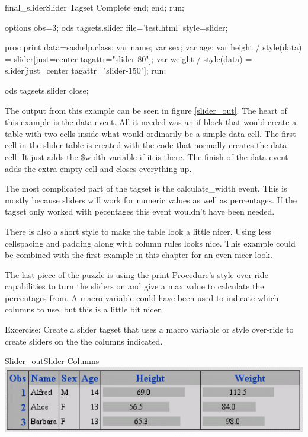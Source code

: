 \begin{fvcode}{final_slider}{Slider Tagset Complete}
        end;
    end;
run;

options obs=3;
ods tagsets.slider file='test.html' style=slider;

proc print data=sashelp.class;
    var name;
    var sex;
    var age;     
    var height / style(data) = slider[just=center tagattr="slider-80"];
    var weight / style(data) = slider[just=center tagattr="slider-150"];
run;

ods tagsets.slider close;
\end{fvcode}        

The output from this example can be seen in figure \vref{slider_out}.
The heart of this example is the data event.  
All it needed was an if block that would create a table with two
cells inside what would ordinarily be a simple data cell.  The first cell
in the slider table is created with the code that normally creates the data
cell.  It just adds the \$width variable if it is there.  The finish
of the data event adds the extra empty cell and closes everything up.

The most complicated part of the tagset is the calculate\_width event.
This is mostly because sliders will work for numeric values as well as
percentages.
If the tagset only worked with pecentages this event wouldn't have been needed.

There is also a short style to make the table look a little nicer.  
Using less cellspacing and padding along with column rules looks nice.  
This example could be combined with the first example in this chapter
for an even nicer look.

The last piece of the puzzle is using the print Procedure's style over-ride
capabilities to turn the sliders on and give a max value to calculate
the percentages from.  A macro variable could have been used to
indicate which columns to use, but this is a little bit nicer.

Excercise:  Create a slider tagset that uses a macro variable or style
over-ride to create sliders on the the columns indicated.

\begin{goutput}{Slider_out}{Slider Columns}
\includegraphics[width=6in]{slider.png}
\end{goutput}

